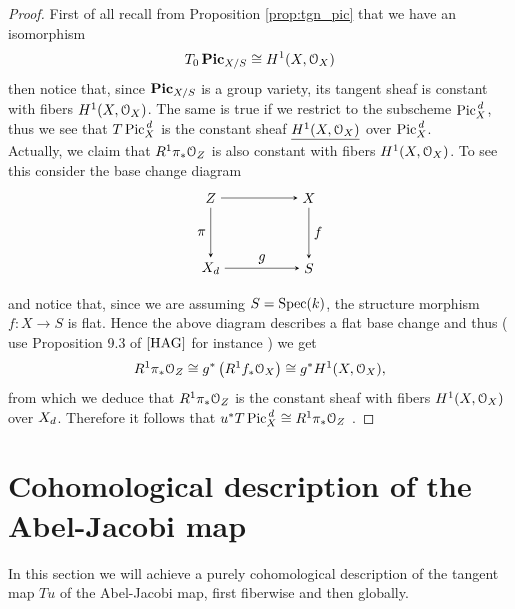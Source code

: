 	\begin{proof}
		First of all recall from Proposition \ref{prop:tgn_pic} that we have an isomorphism
		$$ T_0 \operatorname{\mathbf{Pic}}_{X/S} \cong H^1(X, \mathcal{O}_X)$$
		then notice that, since $\operatorname{\mathbf{Pic}}_{X/S}$ is a group variety, its tangent sheaf is constant with fibers $H^1(X, \mathcal{O}_X)$. The same is true if we restrict to the subscheme $\operatorname{Pic}^{\,d}_X$, thus we see that $ T \operatorname{Pic}^{\,d}_X $ is the constant sheaf $\underline{H^1(X,\mathcal{O}_X)}$ over $\operatorname{Pic}^{\,d}_X$. \\

		Actually, we claim that $R^1 \pi_* \mathcal{O}_{Z}$ is also constant with fibers $H^1(X, \mathcal{O}_X)$. To see this consider the base change diagram
		$$
		\begin{tikzpicture}[node distance=5em, auto]
			\node (A) 															{$Z$};
			\node (B) 	[right of=A, xshift=2em]		{$X$};
		  \node (C) 	[below of=A] 								{$\Dd$};
		  \node (D) 	[right of=C, xshift=2em] 		{$S$};
		  \draw[-stealth]					(A)		to node {} (B);
		  \draw[-stealth][swap]		(A)		to node {$\pi$} (C);
		  \draw[-stealth]					(B)		to node {$f$} (D);
		  \draw[-stealth]					(C)		to node {$g$} (D);
		\end{tikzpicture}
		$$
		and notice that, since we are assuming $S=\operatorname{Spec}(k)$, the structure morphism $f:X\to S$ is flat. Hence the above diagram describes a flat base change and thus ( use Proposition 9.3 of $\cite{HAG}$ for instance ) we get
		$$ R^1 \pi_*\mathcal{O}_{Z} \cong g^* \left( R^1f_*\mathcal{O}_X \right) \cong  g^* H^1(X,\mathcal{O}_X), $$
		from which we deduce that $R^1\pi_* \mathcal{O}_{Z}$ is the constant sheaf with fibers $H^1(X,\mathcal{O}_X)$ over $X_d$. Therefore it follows that $ u^* T \operatorname{Pic}^{\,d}_X \cong R^1 \pi_* \mathcal{O}_{Z} $ .
 	\end{proof}

\section{Cohomological description of the Abel-Jacobi map}
	In this section we will achieve a purely cohomological description of the tangent map $Tu$ of the Abel-Jacobi map, first fiberwise and then globally.
